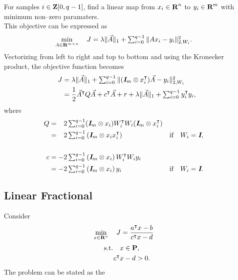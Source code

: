 \documentclass{article}
\begin{document}
    For samples $i\in\textbf{Z}[0,q-1]$, find a linear map from $x_i\in\textbf{R}^n$ 
    to $y_i\in\textbf{R}^m$ with minimum non--zero paramaters. \\
    This objective can be expressed as
    \begin{align*}
            \min_{A\in\textbf{R}^{m\times n}}
        \quad 
        J
        &=
        \lambda\|\vec{A }\|_1
        +
        \textstyle\sum_{i=0}^{q-1} \| A  x_i - y_i \|_{2,W_i}^2.
    \end{align*}
    Vectorizing from left to right and top to bottom and using the Kronecker product, 
    the objective function becomes
    \begin{align*}
        J
        &=
        \lambda\|\vec{A }\|_1
        +
        \textstyle\sum_{i=0}^{q-1} \|(\emph{\textbf{I}}_m\otimes x_i^\intercal)\vec{A} - y_i\|_{2,W_i}^2\\
        &=
        \frac{1}{2}
        \vec{A}^\intercal Q \vec{A} + c^\intercal \vec{A} + r + \lambda\|\vec{A}\|_1
        +\textstyle\sum_{i=0}^{q-1} y_i^\intercal y_i,
    \end{align*}
    where
    \begin{align*}
        Q&=\minus 2\textstyle\sum_{i=0}^{q-1} 
                (\eye_m\otimes x_i)W_i^\tp W_i(\eye_m\otimes x_i^\tp)
            \\
            &=\minus 2\textstyle\sum_{i=0}^{q-1} 
                \left(\eye_m\otimes x_ix_i^\tp\right)
                &&\text{if}\quad W_i=\eye,
        \\\\
            c &=-2\textstyle\sum_{i=0}^{q-1} 
                \left(\eye_m\otimes x_i\right)W_i^\tp W_iy_i\\
                &=-2\textstyle\sum_{i=0}^{q-1} 
                \left(\eye_m\otimes x_i\right)y_i&&\text{if}\quad W_i=\eye.
    \end{align*} 


    \subsection{Linear Fractional}

    Consider
    \begin{align*}
        \min_{x\in\textbf{R}^n} \quad J&=\frac{a^\intercal x - b}{c^\intercal x - d}
    \end{align*}
    \begin{align*}
        \text{s.t.}\quad x&\in\textbf{P},\\
        c^\intercal x& - d  > 0.
    \end{align*}
    The problem can be stated as the \LP \cite[p.~151]{bv_cvxbook}
\end{document}
